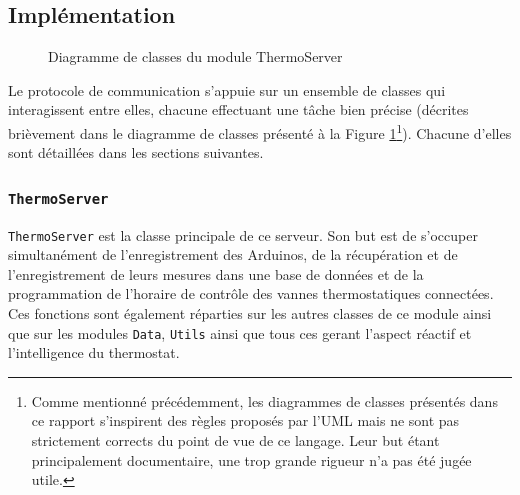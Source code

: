 \documentclass[11pt,a4paper,11pt]{report}
\begin{document}
\subsection{Implémentation}
\begin{figure}
\caption{Diagramme de classes du module ThermoServer}
\label{ThermoServer_class_diagram}
\end{figure}

Le protocole de communication s'appuie sur un ensemble de classes qui interagissent entre elles, chacune effectuant une tâche bien précise (décrites brièvement dans le diagramme de classes présenté à la Figure \ref{ThermoServer_class_diagram}\footnote{Comme mentionné précédemment, les diagrammes de classes présentés dans ce rapport s'inspirent des règles proposés par l'UML mais ne sont pas strictement corrects du point de vue de ce langage. Leur but étant principalement documentaire, une trop grande rigueur n'a pas été jugée utile.}). Chacune d'elles sont détaillées dans les sections suivantes.

\subsubsection{\texttt{ThermoServer}}
\texttt{ThermoServer} est la classe principale de ce serveur. Son but est de s'occuper simultanément de l'enregistrement des Arduinos, de la récupération et de l'enregistrement de leurs mesures dans une base de données et de la programmation de l'horaire de contrôle des vannes thermostatiques connectées. Ces fonctions sont également réparties sur les autres classes de ce module ainsi que sur les modules \texttt{Data}, \texttt{Utils} ainsi que tous ces gerant l'aspect réactif et l'intelligence du thermostat.\\
\end{document}
